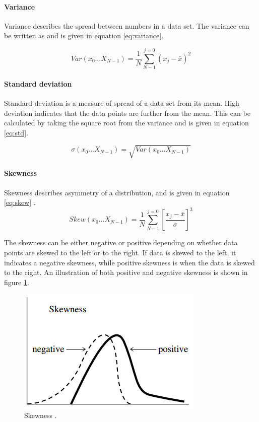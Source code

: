 \documentclass[USenglish]{ifimaster}  %
\begin{document}
	
\paragraph{Variance}
Variance describes the spread between numbers in a data set. The variance can be written as\cite{Press:2007:NRE:1403886} and is given in equation \ref{eq:variance}.
	
	\begin{equation}
	Var(x_0\dotsc X_{N-1})  = \frac{1}{N}\sum_{N-1}^{j=0}(x_{j}-\bar{x})^2
	\label{eq:variance}
	\end{equation}

\paragraph{Standard deviation}
Standard deviation is a measure of spread of a data set from its mean. High deviation indicates that the data points are further from the mean. This can be calculated by taking the square root from the variance\cite{Press:2007:NRE:1403886} and is given in equation \ref{eq:std}.
	
	\begin{equation}
	\sigma(x_0\dotsc X_{N-1})  = \sqrt{Var(x_0\dotsc X_{N-1})}
	\label{eq:std}
	\end{equation}
	
\paragraph{Skewness} 
Skewness describes asymmetry of a distribution, and is given in equation \ref{eq:skew} \cite{Press:2007:NRE:1403886}.
	\begin{equation}
	Skew(x_0\dotsc X_{N-1})  =  \frac{1}{N}\sum_{N-1}^{j=0}\left [ \frac{x_j-\bar{x}}{\sigma} \right ]^3
	\label{eq:skew}
	\end{equation}
	
The skewness can be either negative or positive depending on whether data points are skewed to the left or to the right. If data is skewed to the left, it indicates a negative skewness, while positive skewness is when the data is skewed to the right. An illustration of both positive and negative skewness is shown in figure \ref{fig:skew}.
	
	\begin{figure}[h]
		\centering
		\includegraphics[scale=0.8]{Figures/Skewness}
		\caption[Skewness]{Skewness \cite{Press:2007:NRE:1403886}.}
		\label{fig:skew}
	\end{figure}
	
\end{document}
